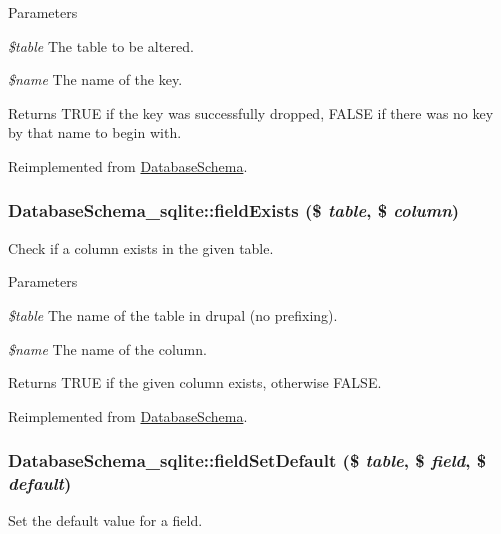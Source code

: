 \begin{DoxyParams}{Parameters}
\item[{\em \$table}]The table to be altered. \item[{\em \$name}]The name of the key.\end{DoxyParams}
\begin{DoxyReturn}{Returns}
TRUE if the key was successfully dropped, FALSE if there was no key by that name to begin with. 
\end{DoxyReturn}


Reimplemented from \hyperlink{classDatabaseSchema_a40519a35f27d1bfe0f2eb0e759df1afd}{DatabaseSchema}.\hypertarget{classDatabaseSchema__sqlite_a0ed3e65a49d4d1fc0db835ed5e49bf45}{
\subsubsection[{fieldExists}]{\setlength{\rightskip}{0pt plus 5cm}DatabaseSchema\_\-sqlite::fieldExists (\$ {\em table}, \/  \$ {\em column})}}
\label{classDatabaseSchema__sqlite_a0ed3e65a49d4d1fc0db835ed5e49bf45}
Check if a column exists in the given table.


\begin{DoxyParams}{Parameters}
\item[{\em \$table}]The name of the table in drupal (no prefixing). \item[{\em \$name}]The name of the column.\end{DoxyParams}
\begin{DoxyReturn}{Returns}
TRUE if the given column exists, otherwise FALSE. 
\end{DoxyReturn}


Reimplemented from \hyperlink{classDatabaseSchema_a1f657a73ea94b4fa0de1d1954350b4e7}{DatabaseSchema}.\hypertarget{classDatabaseSchema__sqlite_a357cd81ce4c000c77592cdcea4bc8d06}{
\subsubsection[{fieldSetDefault}]{\setlength{\rightskip}{0pt plus 5cm}DatabaseSchema\_\-sqlite::fieldSetDefault (\$ {\em table}, \/  \$ {\em field}, \/  \$ {\em default})}}
\label{classDatabaseSchema__sqlite_a357cd81ce4c000c77592cdcea4bc8d06}
Set the default value for a field.


